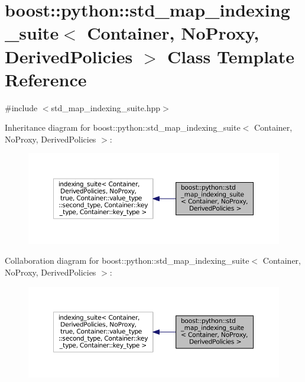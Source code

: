 \hypertarget{classboost_1_1python_1_1std__map__indexing__suite}{\section{boost\-:\-:python\-:\-:std\-\_\-map\-\_\-indexing\-\_\-suite$<$ Container, No\-Proxy, Derived\-Policies $>$ Class Template Reference}
\label{classboost_1_1python_1_1std__map__indexing__suite}
}


{\ttfamily \#include $<$std\-\_\-map\-\_\-indexing\-\_\-suite.\-hpp$>$}



Inheritance diagram for boost\-:\-:python\-:\-:std\-\_\-map\-\_\-indexing\-\_\-suite$<$ Container, No\-Proxy, Derived\-Policies $>$\-:\nopagebreak
\begin{figure}[H]
\begin{center}
\leavevmode
\includegraphics[width=350pt]{classboost_1_1python_1_1std__map__indexing__suite__inherit__graph}
\end{center}
\end{figure}


Collaboration diagram for boost\-:\-:python\-:\-:std\-\_\-map\-\_\-indexing\-\_\-suite$<$ Container, No\-Proxy, Derived\-Policies $>$\-:\nopagebreak
\begin{figure}[H]
\begin{center}
\leavevmode
\includegraphics[width=350pt]{classboost_1_1python_1_1std__map__indexing__suite__coll__graph}
\end{center}
\end{figure}
